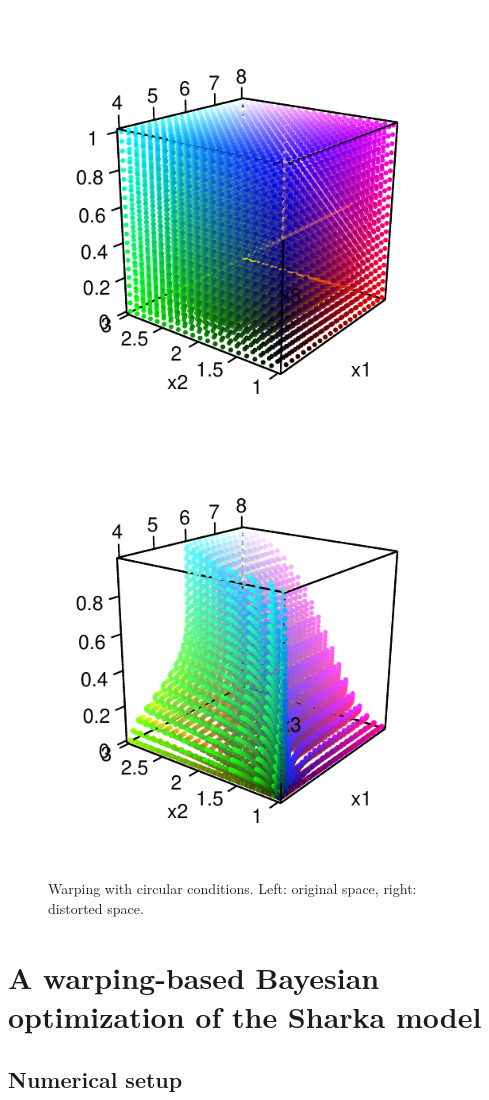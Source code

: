  \begin{figure}[!ht]
 \centering
 \includegraphics[width=.4\textwidth]{def3Dcirc1.pdf}
 \includegraphics[width=.4\textwidth]{def3Dcirc2.pdf}
 \caption{Warping with circular conditions. Left: original space, right: distorted space.}\label{fig:def3Dcirc}
\end{figure}

% 
% 
% 

\section{A warping-based Bayesian optimization of the Sharka model}

\subsection{Numerical setup}

